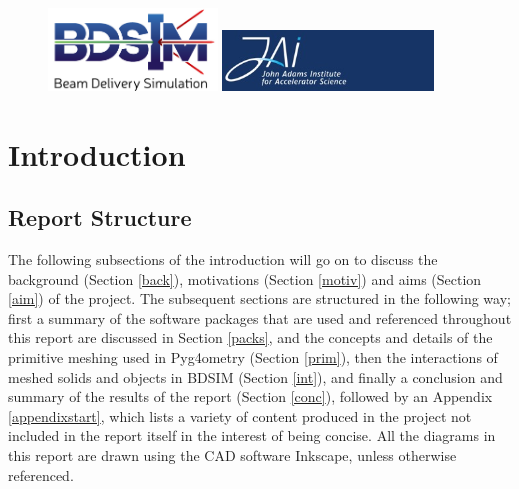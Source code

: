 \documentclass[12pt,a4paper]{article}
\begin{document}
\begin{titlepage}
\begin{figure}[h]
\centering
\begin{minipage}{.6\textwidth}
  \includegraphics[width=0.4\textwidth]{Images//Logos//BDSIM_Logo.jpg}
\end{minipage}%
\begin{minipage}{.6\textwidth}
  \centering
  \includegraphics[width=0.5\textwidth]{Images//Logos//JAI_Logo.jpeg}
  \end{minipage}
\end{figure}

\end{titlepage}
\leavevmode\thispagestyle{empty}\newpage
\tableofcontents
\normalsize
\thispagestyle{empty}
\newpage
\onecolumn

\small
\setcounter{page}{1}


\section{Introduction}

\subsection{Report Structure}
The following subsections of the introduction will go on to discuss the background (Section \ref{back}), motivations (Section \ref{motiv}) and aims (Section \ref{aim}) of the project. The subsequent sections are structured in the following way; first a summary of the software packages that are used and referenced throughout this report are discussed in Section \ref{packs}, and the concepts and details of the primitive meshing used in Pyg4ometry (Section \ref{prim}), then the interactions of meshed solids and objects in BDSIM (Section \ref{int}), and finally a conclusion and summary of the results of the report (Section \ref{conc}), followed by an Appendix \ref{appendixstart}, which lists a variety of content produced in the project not included in the report itself in the interest of being concise. All the diagrams in this report are drawn using the CAD software Inkscape, unless otherwise referenced.
\end{document}

